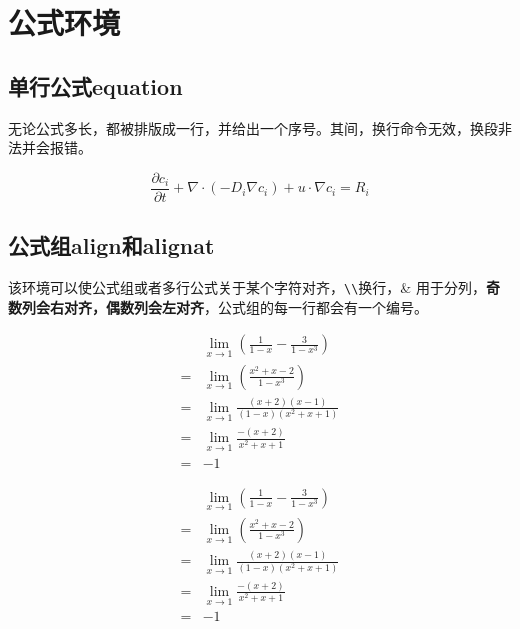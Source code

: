 \section{公式环境}

\subsection{单行公式equation}

无论公式多长，都被排版成一行，并给出一个序号。其间，换行命令无效，换段非法并会报错。

\begin{codeshow}
\begin{equation}
\frac{\partial c_i}{\partial t}+\nabla \cdot (-D_{i} \nabla c_{i})+u \cdot \nabla c_{i}=R_i
\end{equation}
\end{codeshow}



\subsection{公式组align和alignat}

该环境可以使公式组或者多行公式关于某个字符对齐，\lstinline|\\|换行，\& 用于分列，\textbf{奇数列会右对齐，偶数列会左对齐}，公式组的每一行都会有一个编号。

\begin{latex}
\begin{align}
&\lim\limits_{x\to 1}\left(\frac{1}{1-x}-\frac{3}{1-x^3}\right)\\
= &\lim\limits_{x\to 1}\left(\frac{x^2+x-2}{1-x^3}\right)  \\
= & \lim\limits_{x\to 1}\frac{(x+2)(x-1)}{(1-x)(x^2+x+1)}\\
= & \lim\limits_{x\to 1}\frac{-(x+2)}{x^2+x+1}\\
= & -1
\end{align}
\end{latex}

\begin{align}\label{align-lim}
&\lim\limits_{x\to 1}\left(\frac{1}{1-x}-\frac{3}{1-x^3}\right)\\
= &\lim\limits_{x\to 1}\left(\frac{x^2+x-2}{1-x^3}\right)  \\
= & \lim\limits_{x\to 1}\frac{(x+2)(x-1)}{(1-x)(x^2+x+1)}\\
= & \lim\limits_{x\to 1}\frac{-(x+2)}{x^2+x+1}\\
= & -1
\end{align}

